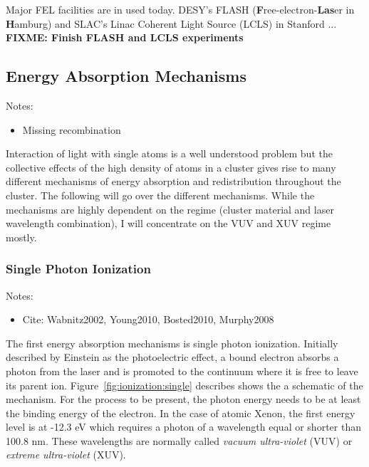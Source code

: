 Major FEL facilities are in used today. DESY's FLASH
(\textbf{F}ree-electron-\textbf{Las}er in \textbf{H}amburg) and
SLAC's Linac Coherent Light Source (LCLS) in Stanford ...
\textbf{FIXME: Finish FLASH and LCLS experiments}













\subsection{Energy Absorption Mechanisms}
\label{section:intro:clusters:heating}

Notes:
\begin{itemize}
\item Missing recombination
\end{itemize}

Interaction of light with single atoms is a well understood problem but the
collective effects of the high density of atoms in a cluster gives rise to many
different mechanisms of energy absorption and redistribution throughout the
cluster. The following will go over the different mechanisms. While the
mechanisms are highly dependent on the regime (cluster material and
laser wavelength combination), I will concentrate on the VUV and XUV
regime mostly.


\subsubsection{Single Photon Ionization}
Notes:
\begin{itemize}
\item Cite: Wabnitz2002, Young2010, Bosted2010, Murphy2008
\end{itemize}

The first energy absorption mechanisms is single photon ionization. Initially
described by Einstein as the photoelectric effect, a bound electron
absorbs a photon from the laser and is promoted to the continuum where it is
free to leave its parent ion. Figure~\ref{fig:ionization:single} describes
shows the a schematic of the mechanism. For the process to be present, the
photon energy
needs to be at least the binding energy of the electron. In the case of
atomic Xenon, the first energy level is at -12.3 eV which requires a photon
of a wavelength equal or shorter than 100.8 nm. These wavelengths are normally
called \textit{vacuum ultra-violet} (VUV) or \textit{extreme
ultra-violet} (XUV).

